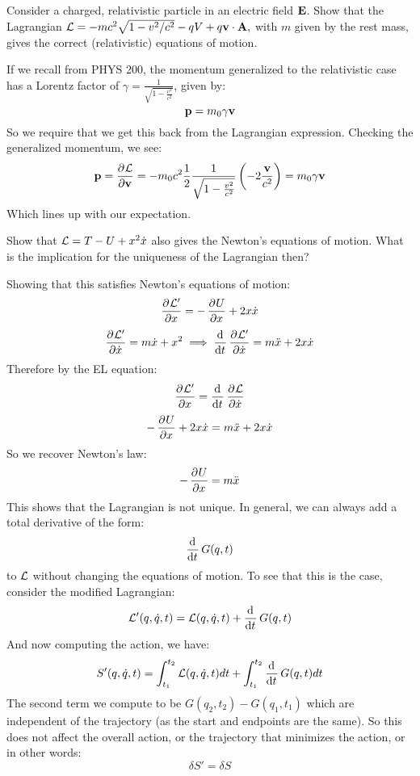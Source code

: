 \begin{p}
Consider a charged, relativistic particle in an electric field $\mathbf{E}$. Show that the Lagrangian $\mathcal{L}=-m c^{2} \sqrt{1-v^{2} / c^{2}}-q V+q \mathbf{v} \cdot \mathbf{A},$ with $m$ given by the rest mass, gives the correct (relativistic) equations of motion.
\end{p}
\begin{s}
If we recall from PHYS 200, the momentum generalized to the relativistic case has a Lorentz factor of $\gamma = \frac{1}{\sqrt{1- \frac{v^2}{c^2}}}$, given by:
\[\mathbf{p} = m_0\gamma\mathbf{v}\]
So we require that we get this back from the Lagrangian expression. Checking the generalized momentum, we see:
\[\v{p} = \dpd{\LL}{\v{v}} = -m_0c^2\frac{1}{2}\frac{1}{\sqrt{1-\frac{v^2}{c^2}}}\left(-2\frac{\v{v}}{c^2}\right) = m_0\gamma\v{v}\]
Which lines up with our expectation.
\end{s}

\begin{p}
Show that $\mathcal{L} = T - U +x^2\dot{x}$ also gives the Newton’s equations of motion. What is the implication for the uniqueness of the Lagrangian then?
\end{p}
\begin{s}
Showing that this satisfies Newton's equations of motion:
\[\dpd{\LL'}{x} = -\dpd{U}{x} + 2x\dot{x}\]
\[\dpd{\LL'}{\dot{x}} = m\dot{x} + x^2 \implies \dod{}{t}\dpd{\LL'}{\dot{x}} = m\ddot{x} + 2x\dot{x}\]
Therefore by the EL equation:
\[\dpd{\LL'}{x} = \dod{}{t}\dpd{\LL}{\dot{x}}\]
\[-\dpd{U}{x} + 2x\dot{x} = m\ddot{x} + 2x\dot{x}\]
So we recover Newton's law:
\[-\dpd{U}{x} = m\ddot{x}\]
This shows that the Lagrangian is not unique. In general, we can always add a total derivative of the form:
\[\dod{}{t}G(q,t)\]
to $\mathcal{L}$ without changing the equations of motion. To see that this is the case, consider the modified Lagrangian:
\[\LL'(q, \dot{q}, t) = \LL(q, \dot{q}, t) + \dod{}{t}G(q,t)\]
And now computing the action, we have:
\[S'(q, \dot{q}, t) = \int_{t_1}^{t_2}\LL(q, \dot{q}, t)dt + \int_{t_1}^{t_2}\dod{}{t}G(q, t)dt\]
The second term we compute to be $G(q_2, t_2) - G(q_1, t_1)$ which are independent of the trajectory (as the start and endpoints are the same). So this does not affect the overall action, or the trajectory that minimizes the action, or in other words:
\[\delta S' = \delta S\]
\end{s}